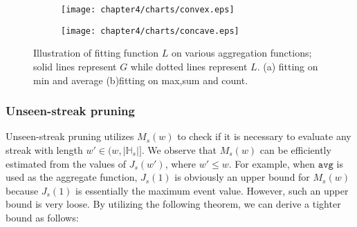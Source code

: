 \begin{figure}
	\centering
    \begin{subfigure}[b]{0.45\textwidth}
        \texttt{[image: chapter4/charts/convex.eps]}
        \caption{}
    \end{subfigure}
    \begin{subfigure}[b]{0.45\textwidth}
        \texttt{[image: chapter4/charts/concave.eps]}
        \caption{}
    \end{subfigure}
    \caption{Illustration of fitting function $L$ on various aggregation functions; solid lines represent $G$ while dotted lines represent $L$. (a) fitting on min and average (b)fitting on max,sum and count.}
    \label{fig:convex_exp}
\end{figure}


\subsubsection{Unseen-streak pruning}
\label{sec:useen-window-bound}
Unseen-streak pruning utilizes $M_s(w)$ to check if it is necessary to evaluate any 
streak with length $w' \in (w,|\mathbb{H}_s|]$. We observe that $M_s(w)$ can
be efficiently estimated from the values of $J_s(w')$, where $w'\leq w$. 
For example, when $\mathtt{avg}$ is used as the aggregate function, $J_s(1)$ is obviously an upper bound for $M_s(w)$ because $J_s(1)$ is essentially the maximum event value. However, such an upper bound is very loose. By utilizing the following theorem, we can derive a tighter bound as follows:

